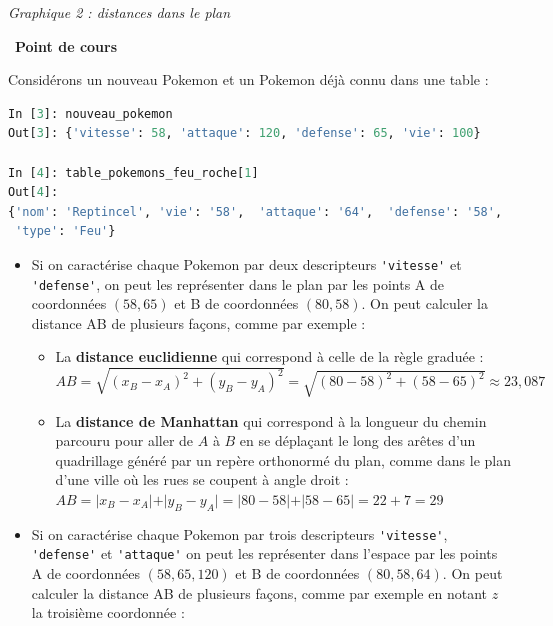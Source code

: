 \documentclass[
  11pt,
]{article}
\newcommand{\passthrough}[1]{#1}
\providecommand{\tightlist}{%
  \setlength{\itemsep}{0pt}\setlength{\parskip}{0pt}}
\newcounter{def}
\newcounter{cours}
\newenvironment{cours}[1]
{\par \medskip   \addtocounter{cours}{1} \noindent  
\begin{bclogo}[arrondi =0.1,  ombre = true, barre=none, logo=\bcbook, marge=4]{~\textbf{Point de cours} \textbf{\thecours} {\itshape #1} }  \par}
{
\end{bclogo}
 \par \bigskip }
\begin{document}
\emph{Graphique 2 : distances dans le plan}

\begin{cours}{}

Considérons un nouveau Pokemon et un Pokemon déjà connu dans une table :

\begin{lstlisting}[language=Python]
In [3]: nouveau_pokemon
Out[3]: {'vitesse': 58, 'attaque': 120, 'defense': 65, 'vie': 100}

In [4]: table_pokemons_feu_roche[1]
Out[4]: 
{'nom': 'Reptincel', 'vie': '58',  'attaque': '64',  'defense': '58',  'vitesse': '80',
 'type': 'Feu'}
\end{lstlisting}

\begin{itemize}
\tightlist
\item
  Si on caractérise chaque Pokemon par deux descripteurs
  \passthrough{\lstinline!'vitesse'!} et
  \passthrough{\lstinline!'defense'!}, on peut les représenter dans le
  plan par les points A de coordonnées \((58, 65)\) et B de coordonnées
  \((80, 58)\). On peut calculer la distance AB de plusieurs façons,
  comme par exemple :

  \begin{itemize}
  \tightlist
  \item
    La \textbf{distance euclidienne} qui correspond à celle de la règle
    graduée :\\
    \(AB=\sqrt{(x_{B}-x_{A})^{2}+(y_{B}-y_{A})^{2}}=\sqrt{(80-58)^{2}+(58-65)^{2}} \approx 23,087\)
  \item
    La \textbf{distance de Manhattan} qui correspond à la longueur du
    chemin parcouru pour aller de \(A\) à \(B\) en se déplaçant le long
    des arêtes d'un quadrillage généré par un repère orthonormé du plan,
    comme dans le plan d'une ville où les rues se coupent à angle droit
    :
    \(AB=\vert x_{B}-x_{A} \vert + \vert y_{B}-y_{A} \vert =\vert 80 - 58 \vert + \vert 58 - 65 \vert = 22 + 7 = 29\)
  \end{itemize}
\item
  Si on caractérise chaque Pokemon par trois descripteurs
  \passthrough{\lstinline!'vitesse'!},
  \passthrough{\lstinline!'defense'!} et
  \passthrough{\lstinline!'attaque'!} on peut les représenter dans
  l'espace par les points A de coordonnées \((58, 65, 120)\) et B de
  coordonnées \((80, 58, 64)\). On peut calculer la distance AB de
  plusieurs façons, comme par exemple en notant \(z\) la troisième
  coordonnée :


\end{itemize}
\end{cours}
\end{document}
